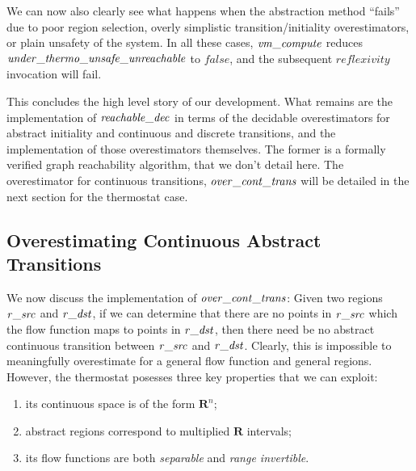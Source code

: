 \documentclass[runningheads]{llncs}
\newcommand{\Varid}[1]{\mathit{#1}}
\newcommand{\IR}{{\mathbf R}}
\begin{document}
We can now also clearly see what happens when the abstraction method ``fails'' due to poor region selection, overly simplistic transition/initiality overestimators, or plain unsafety of the system. In all these cases, \ensuremath{\Varid{vm\char95 compute}} reduces \ensuremath{\Varid{under\char95 thermo\char95 unsafe\char95 unreachable}} to \ensuremath{\Varid{false}}, and the subsequent \ensuremath{\Varid{reflexivity}} invocation will fail.

This concludes the high level story of our development. What remains
are the implementation of \ensuremath{\Varid{reachable\char95 dec}} in terms of the decidable
overestimators for abstract initiality and continuous and discrete
transitions, and the implementation of those overestimators
themselves. The former is a formally verified graph reachability
algorithm, that we don't detail here. The overestimator for continuous
transitions, \ensuremath{\Varid{over\char95 cont\char95 trans}} will be detailed in the next section
for the thermostat case.

\subsection{Overestimating Continuous Abstract Transitions}
\label{over_cont_trans}

We now discuss the implementation of  \ensuremath{\Varid{over\char95 cont\char95 trans}}:
Given two regions \ensuremath{\Varid{r\char95 src}} and \ensuremath{\Varid{r\char95 dst}}, 
if we can determine that there
are no points in \ensuremath{\Varid{r\char95 src}} which the flow function maps to points in
\ensuremath{\Varid{r\char95 dst}}, then there need be no abstract continuous transition between \ensuremath{\Varid{r\char95 src}}
and \ensuremath{\Varid{r\char95 dst}}. Clearly, this is impossible to
meaningfully overestimate for a general flow function and general
regions. However, the thermostat posesses three key properties that
we can exploit:
\begin{enumerate}
\item its continuous space is of the form $\IR^n$;
\item abstract regions correspond to multiplied $\IR$ intervals;
\item its flow functions are both {\em separable\/} and {\em range invertible}.
\end{enumerate}
\end{document}
